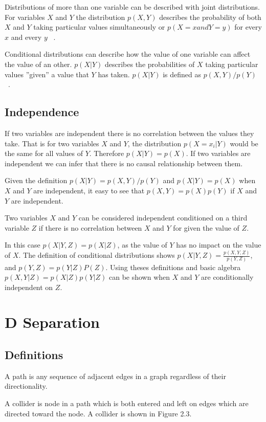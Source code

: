 \documentclass{UoYCSproject}
\begin{document}
Distributions of more than one variable can be described with joint distributions. For variables $X$ and $Y$ the distribution $p(X,Y)$  describes the probability of both $X$ and $Y$ taking particular values simultaneously or $p(X=x and Y=y)$ for every $x$ and every $y$ ~\parencite{barber_2012}. 

Conditional distributions can describe how the value of one variable can affect the value of an other. $p(X|Y)$ describes the probabilities of $X$ taking particular values ''given'' a value that $Y$ has taken. $p(X|Y)$ is defined as $p(X,Y)/p(Y)$ ~\parencite{barber_2012}.


\subsection{Independence}
If two variables are independent there is no correlation between the values they take. That is for two variables $X$ and $Y$, the distribution $p(X=x_i|Y)$ would be the same for all values of $Y$. Therefore $p(X|Y) = p(X)$. If two variables are independent we can infer that there is no causal relationship between them.

Given the definition $p(X|Y) = p(X,Y)/p(Y)$ and $p(X|Y) = p(X)$ when $X$ and $Y$ are independent, it easy to see that $p(X,Y) = p(X)p(Y) $ if $X$ and $Y$ are independent.

Two variables $X$ and $Y$ can be considered independent conditioned on a third variable $Z$ if there is no correlation between $X$ and $Y$ for given the value of $Z$.

In this case $p(X|Y,Z) = p(X|Z)$, as the value of $Y$ has no impact on the value of $X$. The definition of conditional distributions shows $p(X|Y,Z) = \frac{p(X,Y,Z)}{p(Y,Z)}$, and $p(Y,Z) = p(Y|Z)P(Z)$. Using theses definitions and basic algebra $p(X,Y|Z) = p(X|Z)p(Y|Z)$ can be shown when $X$ and $Y$ are conditionally independent on $Z$.

\section{D Separation}

\subsection{Definitions}
A path is any sequence of adjacent edges in a graph regardless of their directionality. 

A collider is node in a path which is both entered and left on edges which are directed toward the node. A collider is shown in  Figure 2.3.
\end{document}
